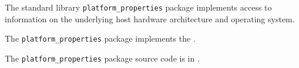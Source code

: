 
The standard library {\tt platform\_properties} package implements access to information on the underlying host hardware architecture and operating system.

The {\tt platform\_properties} package implements the .

The {\tt platform\_properties} package source code is in .





